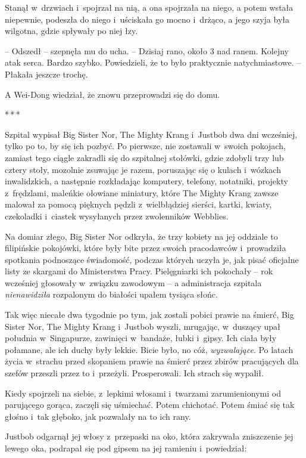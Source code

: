 \documentclass[oneside,polish,11pt,rmheadings]{mwbk}
\newcommand{\threeast}{\par\centerline{*\,*\,*}\medskip\par}
\begin{document}
Stanął w~drzwiach i~spojrzał na nią, a ona spojrzała na niego, a potem wstała niepewnie, podeszła do niego i~uściskała go mocno i~drżąco, a jego szyja była wilgotna, gdzie spływały po niej łzy.

-- Odszedł -- szepnęła mu do ucha. -- Dzisiaj rano, około 3 nad ranem. Kolejny atak serca. Bardzo szybko. Powiedzieli, że to było praktycznie natychmiastowe. -- Płakała jeszcze trochę.

A Wei-Dong wiedział, że znowu przeprowadzi się do domu.

\bigskip
\threeast

Szpital wypisał Big Sister Nor, The Mighty Krang i~Justbob dwa dni wcześniej, tylko po to, by się ich pozbyć. Po pierwsze, nie zostawali w~swoich pokojach, zamiast tego ciągle zakradli się do szpitalnej stołówki, gdzie zdobyli trzy lub cztery stoły, mozolnie zsuwając je razem, poruszając się o kulach i~wózkach inwalidzkich, a następnie rozkładając komputery, telefony, notatniki, projekty z~frędzlami, maleńkie ołowiane miniatury, które The Mighty Krang zawsze malował za pomocą pięknych pędzli z~wielbłądziej sierści, kartki, kwiaty, czekoladki i~ciastek wysyłanych przez zwolenników Webblies.

Na domiar złego, Big Sister Nor odkryła, że trzy kobiety na jej oddziale to filipińskie pokojówki, które były bite przez swoich pracodawców i~prowadziła spotkania podnoszące świadomość, podczas których uczyła je, jak pisać oficjalne listy ze skargami do Ministerstwa Pracy. Pielęgniarki ich pokochały -- rok wcześniej głosowały w~związku zawodowym -- a administracja szpitala \textit{nienawidziła }rozpalonym do białości upałem tysiąca słońc.

Tak więc niecałe dwa tygodnie po tym, jak zostali pobici prawie na śmierć, Big Sister Nor, The Mighty Krang i~Justbob wyszli, mrugając, w~duszący upał południa w~Singapurze, zawinięci w~bandaże, łubki i~gipsy. Ich ciała były połamane, ale ich duchy były lekkie. Bicie było, no cóż, \textit{wyzwalające}. Po latach życia w~strachu przed skopaniem prawie na śmierć przez zbirów pracujących dla szefów przeszli przez to i~przeżyli. Prosperowali. Ich strach się wypalił.

Kiedy spojrzeli na siebie, z~lepkimi włosami i~twarzami zarumienionymi od parującego gorąca, zaczęli się uśmiechać. Potem chichotać. Potem śmiać się tak głośno i~tak głęboko, jak pozwalały na to ich rany.

Justbob odgarnął jej włosy z~przepaski na oko, która zakrywała zniszczenie jej lewego oka, podrapał się pod gipsem na jej ramieniu i~powiedział: 
\end{document}
